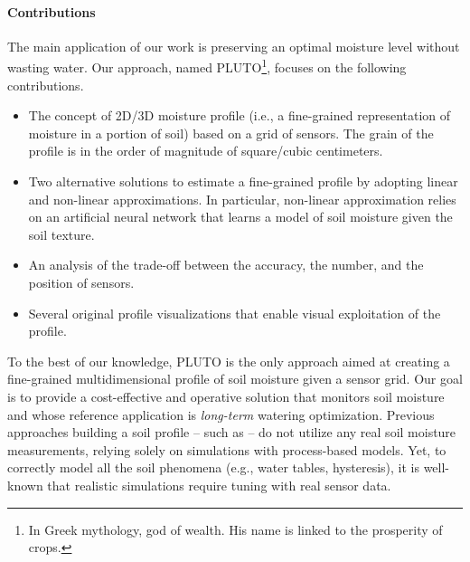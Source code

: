 \paragraph{Contributions} The main application of our work is preserving an optimal moisture level without wasting water.
Our approach, named PLUTO\footnote{In Greek mythology, god of wealth. His name is linked to the prosperity of crops.}, focuses on the following contributions.
\begin{itemize}
    \item The concept of 2D/3D moisture profile (i.e., a fine-grained representation of moisture in a portion of soil) based on a grid of sensors. 
    The grain of the profile is in the order of magnitude of square/cubic centimeters.
    \item Two alternative solutions to estimate a fine-grained profile by adopting linear and non-linear approximations.
    In particular, non-linear approximation relies on an artificial neural network that learns a model of soil moisture given the soil texture.
    \item An analysis of the trade-off between the accuracy, the number, and the position of sensors.
    \item Several original profile visualizations that enable visual exploitation of the profile.
\end{itemize}

To the best of our knowledge, PLUTO is the only approach aimed at creating a fine-grained multidimensional profile of soil moisture given a sensor grid.
Our goal is to provide a cost-effective and operative solution that monitors soil moisture and whose reference application is \textit{long-term} watering optimization.
Previous approaches building a soil profile -- such as \cite{Hinnell2010535} -- do not utilize any real soil moisture measurements, relying solely on simulations with process-based models.
Yet, to correctly model all the soil phenomena (e.g., water tables, hysteresis), it is well-known that realistic simulations require tuning with real sensor data.

